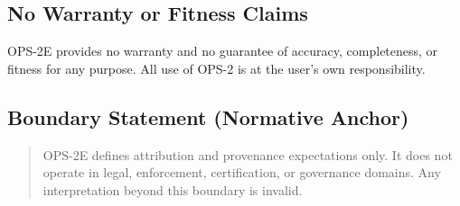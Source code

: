 \subsection{No Warranty or Fitness Claims}
OPS-2E provides no warranty and no guarantee of accuracy, completeness, or fitness for any purpose.
All use of OPS-2 is at the user's own responsibility.

\subsection{Boundary Statement (Normative Anchor)}
\begin{quote}
OPS-2E defines attribution and provenance expectations only.
It does not operate in legal, enforcement, certification, or governance domains.
Any interpretation beyond this boundary is invalid.
\end{quote}
